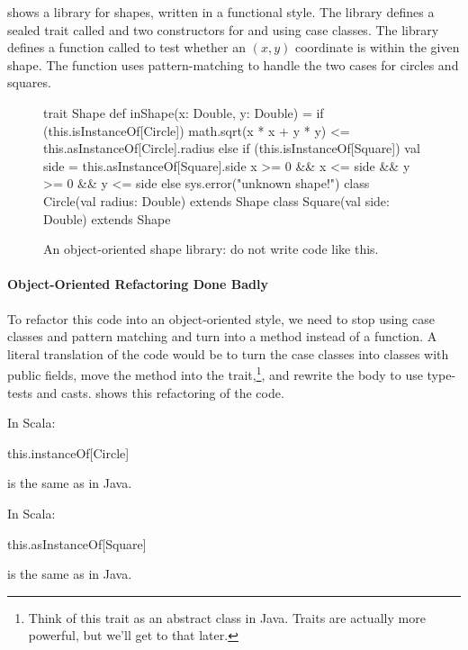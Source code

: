 \documentclass{book}
\begin{document}
 shows a library for shapes, written in a functional style.
The library defines a sealed trait called  and two
constructors for  and  using
case classes. The library defines a function called 
to test whether an $(x,y)$ coordinate is within the given shape. The function
uses pattern-matching to handle the two cases for circles and squares.

\begin{figure}
\begin{scalacode}
trait Shape {
  def inShape(x: Double, y: Double) = {
    if (this.isInstanceOf[Circle]) {
      math.sqrt(x * x + y * y) <= this.asInstanceOf[Circle].radius
    }
    else if (this.isInstanceOf[Square]) {
      val side = this.asInstanceOf[Square].side
      x >= 0 && x <= side && y >= 0 && y <= side
    }
    else {
      sys.error("unknown shape!")
    }
  }
}
class Circle(val radius: Double) extends Shape
class Square(val side: Double) extends Shape
\end{scalacode}
\caption{An object-oriented shape library: do not write code like this.}
\label{jshapesbad}
\end{figure}

\paragraph{Object-Oriented Refactoring Done Badly} To refactor this code into an
object-oriented style, we need to stop using case classes and pattern matching
and turn  into a method instead of a function.
A literal translation of the code would be to turn the case classes
into classes with public fields, move the method into the 
trait,\footnote{Think of this trait as an abstract class in Java. Traits are actually more powerful, but we'll get to that later.}, and rewrite the body to
use type-tests and casts.
  shows this refactoring of the
code.

\begin{notation}
In Scala:
\begin{scalacode}
this.instanceOf[Circle]
\end{scalacode}
is the same as
 in Java.

In Scala:
\begin{scalacode}
this.asInstanceOf[Square]
\end{scalacode}
is the same as  in Java.
\end{notation}
\end{document}

